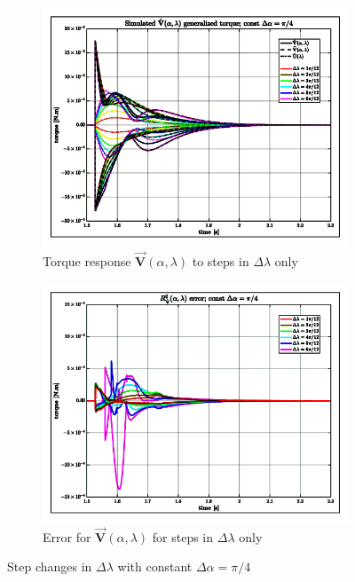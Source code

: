 \begin{figure}[htbp]
\vspace{-10pt}
\centering
\begin{subfigure}{0.49\textwidth}
\centering
\includegraphics[width=\textwidth]{graphs/tau-comb-lam}
\caption{Torque response $\vec{\mathbf{V}}(\alpha,\lambda)$ to steps in $\Delta\lambda$ only}
\label{fig:tau-comb-lam}
\end{subfigure}
\begin{subfigure}{0.49\textwidth}
\centering
\includegraphics[width=\textwidth]{graphs/tau-comb-lam-r}
\caption{Error for $\vec{\mathbf{V}}(\alpha,\lambda)$ for steps in $\Delta\lambda$ only}
\label{fig:tau-comb-lam-r}
\end{subfigure}
\vspace{-6pt}
\caption{Step changes in $\Delta\lambda$ with constant $\Delta\alpha=\pi/4$}
\label{fig:tau-com-lambda}
\vspace{-16pt}
\end{figure}

